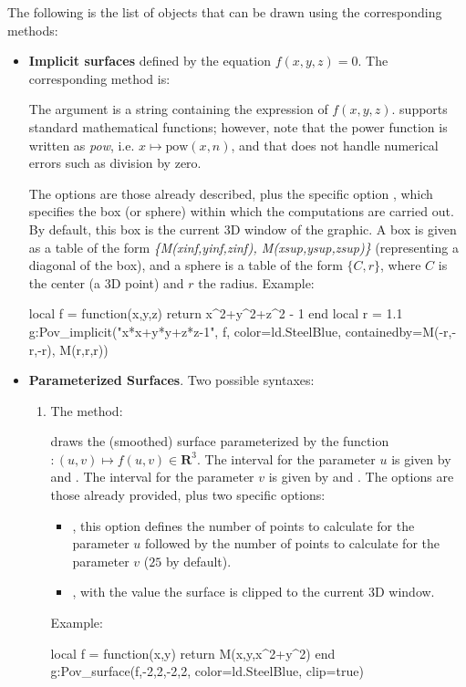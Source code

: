The following is the list of objects that can be drawn using the corresponding methods:
\begin{itemize}
    \item \textbf{Implicit surfaces} defined by the equation \(f(x,y,z)=0\). The corresponding method is: 

    The argument  is a string containing the expression of \(f(x,y,z)\). \povray supports standard mathematical functions; however, note that the power function is written as \emph{pow}, i.e. \(x \mapsto \mathrm{pow}(x,n)\), and that \povray does not handle numerical errors such as division by zero.

    The options are those already described, plus the specific option , which specifies the box (or sphere) within which the computations are carried out. By default, this box is the current 3D window of the graphic. A box is given as a table of the form \emph{\{M(xinf,yinf,zinf), M(xsup,ysup,zsup)\}} (representing a diagonal of the box), and a sphere is a table of the form $\{C,r\}$, where $C$ is the center (a 3D point) and $r$ the radius. Example:
    \begin{Luacode}
    local f = function(x,y,z) return x^2+y^2+z^2 - 1 end
    local r = 1.1
    g:Pov_implicit("x*x+y*y+z*z-1", f, {color=ld.SteelBlue, containedby={M(-r,-r,-r), M(r,r,r)}})
    \end{Luacode}

    \item \textbf{Parameterized Surfaces}. Two possible syntaxes:

    \begin{enumerate}
        \item The method: 
        
        draws the (smoothed) surface parameterized by the function $\colon(u,v) \mapsto f(u,v)\in \mathbf R^3$. The interval for the parameter $u$ is given by  and . The interval for the parameter $v$ is given by  and . The options are those already provided, plus two specific options:
        \begin{itemize}
        \item {}, this option defines the number of points to calculate for the parameter $u$ followed by the number of points to calculate for the parameter $v$ ($25$ by default).
        \item {}, with the value \true the surface is clipped to the current 3D window.
        \end{itemize}
        Example:
        \begin{Luacode}
        local f = function(x,y) return M(x,y,x^2+y^2) end
        g:Pov_surface(f,-2,2,-2,2, {color=ld.SteelBlue, clip=true})
        \end{Luacode}
        

\end{enumerate}
\end{itemize}
